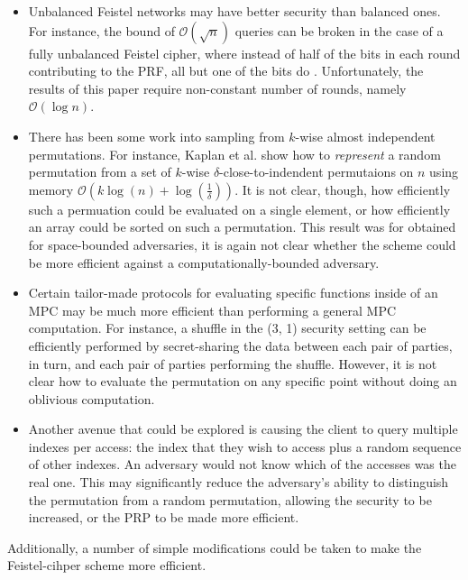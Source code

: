 \begin{itemize}

\item
Unbalanced Feistel networks may have better security than balanced ones.
For instance, the bound of $\mathcal{O}(\sqrt{n})$ queries can be broken
in the case of a fully unbalanced Feistel cipher, where instead
of half of the bits in each round contributing to the PRF, 
all but one of the bits do \cite{morris2009encipher}.
Unfortunately, the results of this paper require non-constant number of rounds, 
namely $\mathcal{O}(\log{n})$.

\item
There has been some work into sampling from $k$-wise almost independent permutations.
For instance, Kaplan et al. \cite{kaplan2009derandomized} show how to 
\emph{represent} a random permutation from a set of $k$-wise 
$\delta$-close-to-indendent
permutaions on $n$ using memory $\mathcal{O}(k\log{(n)} + \log(\frac{1}{\delta}))$.
It is not clear, though, how efficiently such a permuation could be evaluated
on a single element, or how efficiently an array could be sorted on such a 
permutation.
This result was for obtained for space-bounded adversaries,
it is again not clear whether the scheme could be more efficient
against a computationally-bounded adversary.

\item 
Certain tailor-made protocols for evaluating specific functions
inside of an MPC may be much more efficient than performing a general MPC
computation.
For instance, a shuffle in the (3, 1) security setting can be 
efficiently performed by secret-sharing the data between each pair
of parties, in turn, and each pair of parties performing the shuffle.
However, it is not clear how to evaluate the permutation on any
specific point without doing an oblivious computation.

\item
Another avenue that could be explored is causing the client
to query multiple indexes per access:
the index that they wish to access plus a random sequence of other indexes.
An adversary would not know which of the accesses was the real one.
This may significantly reduce the adversary's ability 
to distinguish the permutation from a random permutation,
allowing the security to be increased, or the PRP to be made more efficient.

\end{itemize}

Additionally, a number of simple modifications could be taken to make
the Feistel-cihper scheme more efficient.

